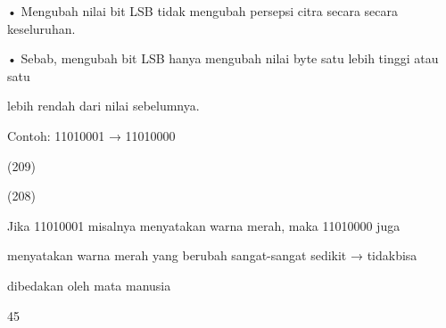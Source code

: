 \documentclass{article}
\begin{document}

• Mengubah nilai bit LSB tidak mengubah persepsi citra secara secara keseluruhan. 

• Sebab, mengubah bit LSB hanya mengubah nilai byte satu lebih tinggi atau satu 

lebih rendah dari nilai sebelumnya.

   Contoh: 11010001   → 11010000


           (209) 

             (208)

  Jika 11010001 misalnya menyatakan warna merah, maka 11010000  juga 

menyatakan warna merah yang berubah sangat-sangat sedikit  → tidakbisa 

dibedakan oleh mata manusia

45
\end{document}
